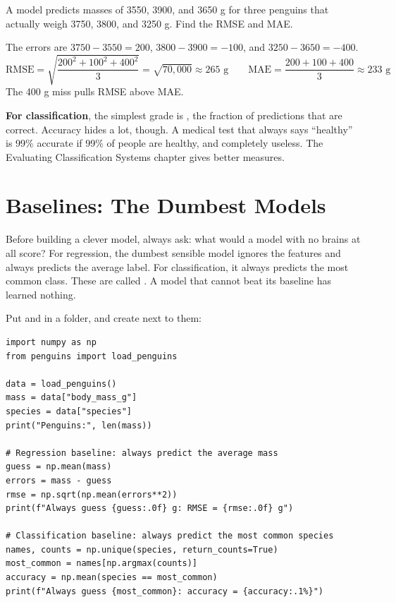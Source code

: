 \begin{Worked}
\begin{Problem}
A model predicts masses of 3550, 3900, and 3650 g for three penguins that actually weigh
3750, 3800, and 3250 g. Find the RMSE and MAE.
\end{Problem}
\begin{Solution}
The errors are $3750 - 3550 = 200$, $3800 - 3900 = -100$, and $3250 - 3650 = -400$.
$$\text{RMSE} = \sqrt{\frac{200^2 + 100^2 + 400^2}{3}} = \sqrt{70{,}000} \approx 265 \text{ g}
\qquad
\text{MAE} = \frac{200 + 100 + 400}{3} \approx 233 \text{ g}$$
The 400 g miss pulls RMSE above MAE.
\end{Solution}
\end{Worked}

\textbf{For classification}, the simplest grade is , the fraction of
predictions that are correct. Accuracy hides a lot, though. A medical test that always says ``healthy'' is
99\% accurate if 99\% of people are healthy, and completely useless. The Evaluating Classification Systems
chapter gives better measures.

\section{Baselines: The Dumbest Models}
Before building a clever model, always ask: what would a model with no brains at all score? For regression,
the dumbest sensible model ignores the features and always predicts the average label. For classification, it
always predicts the most common class. These are called . A model that cannot beat its
baseline has learned nothing.

Put  and  in a folder, and create  next to
them:

\begin{verbatim}
import numpy as np
from penguins import load_penguins

data = load_penguins()
mass = data["body_mass_g"]
species = data["species"]
print("Penguins:", len(mass))

# Regression baseline: always predict the average mass
guess = np.mean(mass)
errors = mass - guess
rmse = np.sqrt(np.mean(errors**2))
print(f"Always guess {guess:.0f} g: RMSE = {rmse:.0f} g")

# Classification baseline: always predict the most common species
names, counts = np.unique(species, return_counts=True)
most_common = names[np.argmax(counts)]
accuracy = np.mean(species == most_common)
print(f"Always guess {most_common}: accuracy = {accuracy:.1%}")
\end{verbatim}

